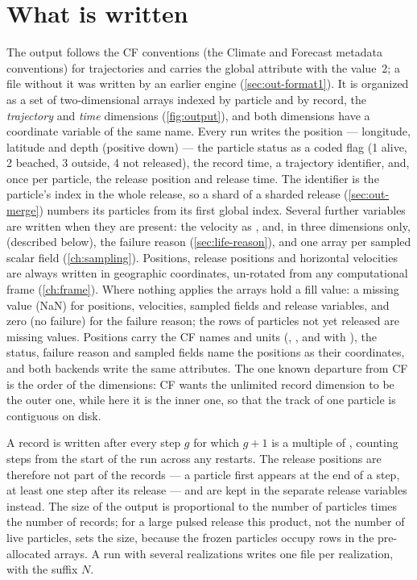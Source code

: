 \section{What is written}\label{sec:out-schema}

The output follows the CF conventions (the Climate and Forecast metadata conventions) for trajectories and
carries the global attribute  with the value~2; a file without it was written by an
earlier engine (\cref{sec:out-format1}). It is organized as a set of two-dimensional arrays indexed by
particle and by record, the \emph{trajectory} and \emph{time} dimensions (\cref{fig:output}), and both
dimensions have a coordinate variable of the same name. Every run writes the position --- longitude,
latitude and depth (positive down) --- the particle status as a coded flag (1 alive, 2 beached, 3 outside,
4 not released), the record time, a trajectory identifier, and, once per particle, the release position and
release time. The identifier is the particle's index in the whole release, so a shard of a sharded release
(\cref{sec:out-merge}) numbers its particles from its first global index. Several further variables are
written when they are present: the velocity as ,  and, in three dimensions only,
 (described below), the failure reason (\cref{sec:life-reason}), and one array per
sampled scalar field (\cref{ch:sampling}). Positions, release positions and horizontal velocities are always
written in geographic coordinates, un-rotated from any computational frame (\cref{ch:frame}). Where nothing
applies the arrays hold a fill value: a missing value (NaN) for positions, velocities, sampled fields and
release variables, and zero (no failure) for the failure reason; the rows of particles not yet released are
missing values. Positions carry the CF names and units (, , and
 with ), the status, failure reason and sampled fields name the
positions as their coordinates, and both backends write the same attributes. The one known departure from
CF is the order of the dimensions: CF wants the unlimited record dimension to be the outer one, while here
it is the inner one, so that the track of one particle is contiguous on disk.

A record is written after every step $g$ for which $g+1$ is a multiple of , counting steps
from the start of the run across any restarts. The release positions are therefore not part of the records ---
a particle first appears at the end of a step, at least one step after its release --- and are kept in the
separate release variables instead. The size of the output is proportional to
the number of particles times the number of records; for a large pulsed release this product, not the number
of live particles, sets the size, because the frozen particles occupy rows in the pre-allocated arrays. A run
with several realizations writes one file per realization, with the suffix $N$.


